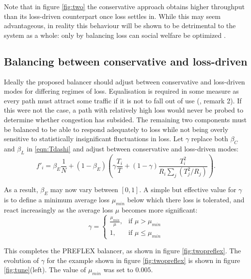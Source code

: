 Note that in figure \ref{fig:two} the conservative approach obtains higher throughput than its loss-driven counterpart once loss settles in. 
While this may seem advantageous, in reality this behaviour will be shown to be detrimental to the system as a whole: only by balancing loss can social welfare be optimized \cite{Kelly:2005p140}.

\subsection{Balancing between conservative and loss-driven}

Ideally the proposed balancer should adjust between conservative and loss-driven modes for differing regimes of loss.
Equalisation is required in some measure as every path must attract some traffic if it is not to fall out of use (\cite{Kelly:2005p140}, remark 2). 
If this were not the case, a path with relatively high loss would never be probed to determine whether congestion has subsided.
The remaining two components must be balanced to be able to respond adequately to loss while not being overly sensitive to statistically insignificant fluctuations in loss. 
Let $\gamma$ replace both $\beta_C$ and $\beta_L$ in \eqref{eqn:Tdashi} and adjust between conservative and loss-driven modes:
\begin{equation}
f'_i = \beta_E \frac{1}{N} + \left( 1-\beta_E \right) \left(
\gamma \frac{T_i}{T} + \left(1-\gamma\right) \frac{T_i^2}{R_i \sum_j
(T_j^2/R_j)} \right).
\label{eqn:gamma}
\end{equation}

As a result, $\beta_E$ may now vary between $[0,1]$. 
A simple but effective value for $\gamma$ is to define a minimum average loss $\mu_{min}$ below which there loss is tolerated, and react increasingly as the average loss $\mu$ becomes more significant:
\begin{equation}
\gamma = 
\begin{cases} 
\frac{\mu_{min}}{\mu}, & \mbox{if }\mu > \mu_{min}\\
1, & \mbox{if }\mu \leq \mu_{min}
\end{cases}
\end{equation}

This completes the \ac{PREFLEX} balancer, as shown in figure \ref{fig:twopreflex}. 
The evolution of $\gamma$ for the example shown in figure \ref{fig:twopreflex} is shown in figure \ref{fig:tune}(left). 
The value of $\mu_{min}$ was set to $0.005$.

